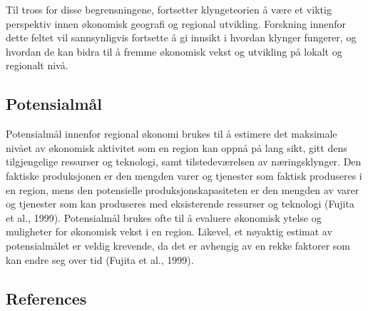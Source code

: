 \documentclass[
]{article}
\begin{document}
Til tross for disse begrensningene, fortsetter klyngeteorien å være et
viktig perspektiv innen økonomisk geografi og regional utvikling.
Forskning innenfor dette feltet vil sannsynligvis fortsette å gi innsikt
i hvordan klynger fungerer, og hvordan de kan bidra til å fremme
økonomisk vekst og utvikling på lokalt og regionalt nivå.

\hypertarget{potensialmuxe5l}{%
\subsection{Potensialmål}\label{potensialmuxe5l}}

Potensialmål innenfor regional økonomi brukes til å estimere det
maksimale nivået av økonomisk aktivitet som en region kan oppnå på lang
sikt, gitt dens tilgjengelige ressurser og teknologi, samt
tilstedeværelsen av næringsklynger. Den faktiske produksjonen er den
mengden varer og tjenester som faktisk produseres i en region, mens den
potensielle produksjonskapasiteten er den mengden av varer og tjenester
som kan produseres med eksisterende ressurser og teknologi (Fujita et
al., 1999). Potensialmål brukes ofte til å evaluere økonomisk ytelse og
muligheter for økonomisk vekst i en region. Likevel, et nøyaktig estimat
av potensialmålet er veldig krevende, da det er avhengig av en rekke
faktorer som kan endre seg over tid (Fujita et al., 1999).

\newpage

\hypertarget{references}{%
\subsection*{References}\label{references}}
\end{document}
